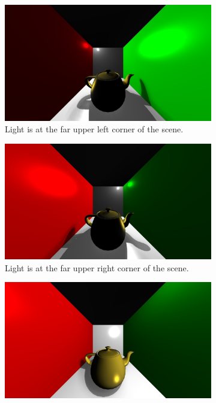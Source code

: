 \begin{figure}
        \centering
        \begin{subfigure}[b]{0.5\textwidth}
                \includegraphics[width=\textwidth]{AltResults/teapotFL.jpg}
                \caption{Light is at the far upper left corner of the scene.}
        \end{subfigure}
        \begin{subfigure}[b]{0.5\textwidth}
                \includegraphics[width=\textwidth]{AltResults/teapotFR.jpg}
                \caption{Light is at the far upper right corner of the scene.}
        \end{subfigure}
        \begin{subfigure}[b]{0.5\textwidth}
                \includegraphics[width=\textwidth]{AltResults/teapotNR.jpg}

\end{subfigure}
\end{figure}
